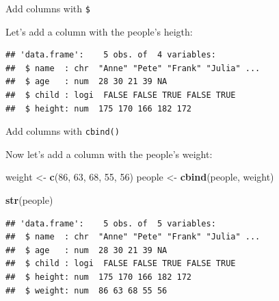 \documentclass[ignorenonframetext,]{beamer}
\newenvironment{Shaded}{\begin{snugshade}}{\end{snugshade}}
\newcommand{\DecValTok}[1]{\textcolor[rgb]{0.00,0.00,0.81}{#1}}
\newcommand{\KeywordTok}[1]{\textcolor[rgb]{0.13,0.29,0.53}{\textbf{#1}}}
\newcommand{\NormalTok}[1]{#1}
\newcommand{\OperatorTok}[1]{\textcolor[rgb]{0.81,0.36,0.00}{\textbf{#1}}}
\newcommand{\StringTok}[1]{\textcolor[rgb]{0.31,0.60,0.02}{#1}}
\begin{document}
\begin{frame}[fragile]{Add columns with \texttt{\$}}
\protect\hypertarget{add-columns-with-1}{}

Let's add a column with the people's heigth:

\begin{Shaded}
\end{Shaded}

\begin{verbatim}
## 'data.frame':    5 obs. of  4 variables:
##  $ name  : chr  "Anne" "Pete" "Frank" "Julia" ...
##  $ age   : num  28 30 21 39 NA
##  $ child : logi  FALSE FALSE TRUE FALSE TRUE
##  $ height: num  175 170 166 182 172
\end{verbatim}

\end{frame}

\begin{frame}[fragile]{Add columns with \texttt{cbind()}}
\protect\hypertarget{add-columns-with-cbind}{}

Now let's add a column with the people's weight:

\begin{Shaded}
\begin{Highlighting}[]
\NormalTok{ weight <-}\StringTok{ }\KeywordTok{c}\NormalTok{(}\DecValTok{86}\NormalTok{, }\DecValTok{63}\NormalTok{, }\DecValTok{68}\NormalTok{, }\DecValTok{55}\NormalTok{, }\DecValTok{56}\NormalTok{)}
\NormalTok{ people <-}\StringTok{ }\KeywordTok{cbind}\NormalTok{(people, weight)}
 
 \KeywordTok{str}\NormalTok{(people)}
\end{Highlighting}
\end{Shaded}

\begin{verbatim}
## 'data.frame':    5 obs. of  5 variables:
##  $ name  : chr  "Anne" "Pete" "Frank" "Julia" ...
##  $ age   : num  28 30 21 39 NA
##  $ child : logi  FALSE FALSE TRUE FALSE TRUE
##  $ height: num  175 170 166 182 172
##  $ weight: num  86 63 68 55 56
\end{verbatim}

\end{frame}
\end{document}
